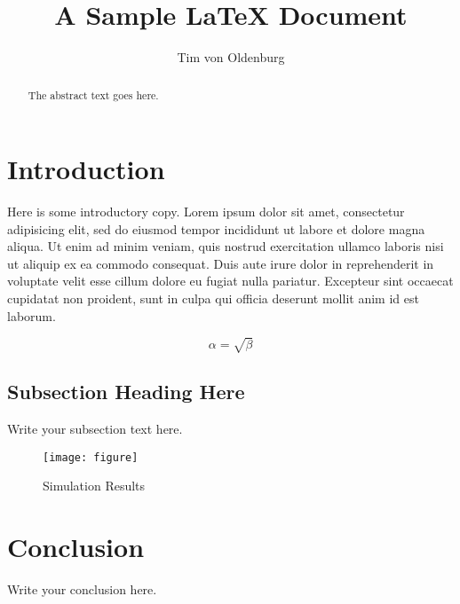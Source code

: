 \documentclass{article}
\begin{document}
\title{A Sample \LaTeX{} Document}
\author{Tim von Oldenburg}

\maketitle

\begin{abstract}
The abstract text goes here.
\end{abstract}

\section{Introduction}
Here is some introductory copy.
Lorem ipsum dolor sit amet, consectetur adipisicing elit, sed do eiusmod
tempor incididunt ut labore et dolore magna aliqua. Ut enim ad minim veniam,
quis nostrud exercitation ullamco laboris nisi ut aliquip ex ea commodo
consequat. Duis aute irure dolor in reprehenderit in voluptate velit esse
cillum dolore eu fugiat nulla pariatur. Excepteur sint occaecat cupidatat non
proident, sunt in culpa qui officia deserunt mollit anim id est laborum.

\begin{equation}
    \label{simple_equation}
    \alpha = \sqrt{ \beta }
\end{equation}

\subsection{Subsection Heading Here}
Write your subsection text here.

\begin{figure}
    \centering
    \texttt{[image: figure]}
    \caption{Simulation Results}
    \label{simulationfigure}
\end{figure}

\section{Conclusion}
Write your conclusion here.
\end{document}
